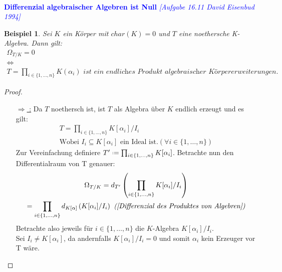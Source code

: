 \documentclass[10pt,a4paper]{report}
\newcommand{\comment}[1]{}
\newcommand{\ModulsOfDifferenzials}{David Eisenbud 1994}
\newcounter{Aussage}[chapter]
\newtheorem{bsp}[Aussage]{Beispiel}
\newcommand{\divR}[2]{\Omega_{#1/#2}}
\newcommand{\divf}[1]{d_{#1}}
\newcommand*{\defeq}{\mathrel{\vcenter{\baselineskip0.5ex \lineskiplimit0pt
                     \hbox{\scriptsize.}\hbox{\scriptsize.}}}%
                     =}
\begin{document}
\ \\
\textcolor{blue}{\textbf{Differenzial algebraischer Algebren ist Null} \textit{[Aufgabe 16.11 \ModulsOfDifferenzials]}}
\begin{bsp}\comment{\label{Differenzial algebraischer Algebren ist Null}}
Sei $K$ ein Körper mit $char(K) = 0$ \comment{Dies habe ich im gesamten Beweis nicht verwendet.} und $T$ eine noethersche K-Algebra. Dann gilt:
\begin{gather*}
\divR{T}{K} = 0 \\
\Leftrightarrow \\
T = \prod_{i \in \lbrace 1, \dots, n \rbrace} K(\alpha_i) \textit{ ist ein endliches Produkt algebraischer Körpererweiterungen.} 
\end{gather*}
\end{bsp}
\begin{proof}
\ \\
\begin{itemize}
\item[\underline{{\glqq $\Rightarrow$ \grqq :}}]
Da $T$ noethersch ist, ist $T$ als Algebra über $K$ endlich erzeugt und es gilt:
\begin{gather*}
\comment{
T = T'/I \\
\text{Mit: } T' \defeq \left( \prod_{i \in \lbrace 1,\dots,n \rbrace} K[\alpha_i] \right) \text{ und } I \defeq \left( \prod_{i \in \lbrace 1,\dots,n \rbrace} I_i \right) \subseteq T' \text{ ist ein Ideal.} \\
\text{Also gilt } T = \prod_{i \in \lbrace 1,\dots,n \rbrace} K[\alpha_i]/I_i
}
T = \prod_{i \in \lbrace 1,\dots,n \rbrace} K[\alpha_i]/I_i \\
\text{Wobei } I_i \subseteq K[\alpha_i] \text{ ein Ideal ist.} (\forall i \in \lbrace 1, \dots ,n \rbrace)
\end{gather*}
Zur Vereinfachung definiere $T' \defeq \prod_{i \in \lbrace 1,\dots,n \rbrace} K[\alpha_i]$. Betrachte nun den Differentialraum von T genauer:
\begin{gather*}
\divR{T}{K} = \divf{T'} \left( \prod_{i \in \lbrace 1,\dots,n \rbrace} K[\alpha_i]/I_i \right)\\
= \prod_{i \in \lbrace 1,\dots,n \rbrace} \divf{K[\alpha]}\left( K[\alpha_i]/I_i \right) \textit{ (\cref{Differenzial des Produktes von Algebren})}
\end{gather*}
Betrachte also jeweils für $i \in \lbrace 1,\dots,n \rbrace$ die $K$-Algebra $K[\alpha_i]/I_i$.\\ 
Sei $I_i \neq K[\alpha_i]$, da andernfalls $K[\alpha_i]/I_i = 0$ und somit $\alpha_i$ kein Erzeuger vor T wäre. \\

\end{itemize}
\end{proof}
\end{document}
